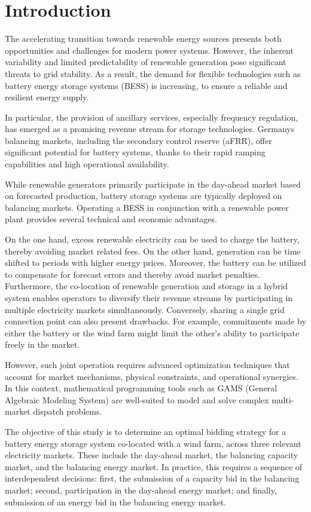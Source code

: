 \chapter{Introduction}

The accelerating transition towards renewable energy sources presents both opportunities
and challenges for modern power systems. However, the inherent variability and limited
predictability of renewable generation pose significant threats to grid stability.
As a result, the demand for flexible technologies such as battery energy storage systems (BESS) is increasing,
to ensure a reliable and resilient energy supply.

In particular, the provision of ancillary services, especially frequency regulation, has emerged
as a promising revenue stream for storage technologies. Germany\textquotesingle s balancing markets,
including the secondary control reserve (aFRR), offer significant potential for battery systems,
thanks to their rapid ramping capabilities and high operational availability.

While renewable generators primarily participate in the day-ahead market based on
forecasted production, battery storage systems are typically deployed on balancing markets.
Operating a BESS in conjunction with a renewable power plant provides several technical and economic advantages.

On the one hand, excess renewable electricity can be used to charge the battery, thereby
avoiding market related fees. On the other hand, generation can be time shifted to periods
with higher energy prices. Moreover, the battery can be utilized to compensate for forecast errors and thereby avoid market penalties.
Furthermore, the co-location of renewable generation and storage in a hybrid system
enables operators to diversify their revenue streams by participating in multiple electricity markets simultaneously.
Conversely, sharing a single grid connection point can also present drawbacks.
For example, commitments made by either the battery or the wind farm might
limit the other's ability to participate freely in the market.

However, such joint operation requires advanced optimization techniques that account for market
mechanisms, physical constraints, and operational synergies.
In this context, mathematical programming tools such as GAMS (General Algebraic Modeling System)
are well-suited to model and solve complex multi-market dispatch problems.

The objective of this study is to determine an optimal bidding strategy for a battery energy storage system
co-located with a wind farm, across three relevant electricity markets. These include the day-ahead market,
the balancing capacity market, and the balancing energy market.
In practice, this requires a sequence of interdependent decisions:
first, the submission of a capacity bid in the balancing market;
second, participation in the day-ahead energy market;
and finally, submission of an energy bid in the balancing energy market.

